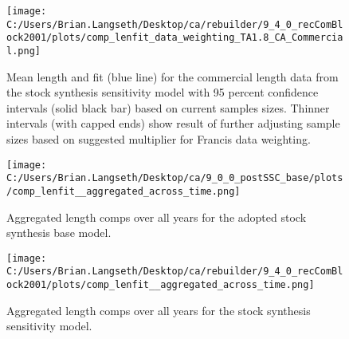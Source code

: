 \documentclass[11pt,
  english,
  a4paper,
]{article}
\begin{document}
\tagmcend\tagstructend


\begin{figure}
\centering
\texttt{[image: C:/Users/Brian.Langseth/Desktop/ca/rebuilder/9\_4\_0\_recComBlock2001/plots/comp\_lenfit\_data\_weighting\_TA1.8\_CA\_Commercial.png]}
\caption{Mean length and fit (blue line) for the commercial length data from the stock synthesis sensitivity model with 95 percent confidence intervals (solid black bar) based on current samples sizes. Thinner intervals (with capped ends) show result of further adjusting sample sizes based on suggested multiplier for Francis data weighting.\label{fig:MeanLengthFit-sens}}
\end{figure}

\tagmcend\tagstructend


\begin{figure}
\centering
\texttt{[image: C:/Users/Brian.Langseth/Desktop/ca/9\_0\_0\_postSSC\_base/plots/comp\_lenfit\_\_aggregated\_across\_time.png]}
\caption{Aggregated length comps over all years for the adopted stock synthesis base model.\label{fig:aggLenFit-base}}
\end{figure}

\tagmcend\tagstructend


\begin{figure}
\centering
\texttt{[image: C:/Users/Brian.Langseth/Desktop/ca/rebuilder/9\_4\_0\_recComBlock2001/plots/comp\_lenfit\_\_aggregated\_across\_time.png]}
\caption{Aggregated length comps over all years for the stock synthesis sensitivity model.\label{fig:aggLenFit-sens}}
\end{figure}
\end{document}
